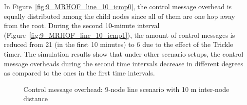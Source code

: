 In Figure~\ref{fig:9_MRHOF_line_10_icmp0}, the control message overhead is equally distributed among the child nodes since all of them are one hop away from the root. During the second 10-minute interval (Figure~\ref{fig:9_MRHOF_line_10_icmp1}), the amount of control messages is reduced from 21 (in the first 10 minutes) to 6 due to the effect of the Trickle timer. The simulation results show that under other scenario setups, the control message overheads during the second time intervals decrease in different degrees as compared to the ones in the first time intervals.

\begin{figure}[p]
  \begin{center}
    \leavevmode
    \caption{Control message overhead: 9-node line scenario with 10 m inter-node distance}
    \label{fig:9_MRHOF_line_10_icmp}
  \end{center}
   \vspace{-20pt}
\end{figure}

